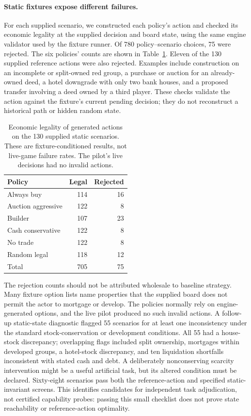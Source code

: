 \paragraph{Static fixtures expose different failures.}
For each supplied scenario, we constructed each policy's action and checked its economic legality at the supplied decision and board state, using the same engine validator used by the fixture runner. Of 780 policy--scenario choices, 75 were rejected. The six policies' counts are shown in Table~\ref{tab:agenda-fixture-legality}. Eleven of the 130 supplied reference actions were also rejected. Examples include construction on an incomplete or split-owned red group, a purchase or auction for an already-owned deed, a hotel downgrade with only two bank houses, and a proposed transfer involving a deed owned by a third player. These checks validate the action against the fixture's current pending decision; they do not reconstruct a historical path or hidden random state.

\begin{table}[htbp]
\centering
\caption{Economic legality of generated actions on the 130 supplied static scenarios. These are fixture-conditioned results, not live-game failure rates. The pilot's live decisions had no invalid actions.}
\label{tab:agenda-fixture-legality}
\begin{tabular}{lrr}
\toprule
Policy & Legal & Rejected \\
\midrule
Always buy & 114 & 16 \\
Auction aggressive & 122 & 8 \\
Builder & 107 & 23 \\
Cash conservative & 122 & 8 \\
No trade & 122 & 8 \\
Random legal & 118 & 12 \\
\midrule
Total & 705 & 75 \\
\bottomrule
\end{tabular}
\end{table}

The rejection counts should not be attributed wholesale to baseline strategy. Many fixture option lists name properties that the supplied board does not permit the actor to mortgage or develop. The policies normally rely on engine-generated options, and the live pilot produced no such invalid actions. A follow-up static-state diagnostic flagged 55 scenarios for at least one inconsistency under the standard stock-conservation or development conditions. All 55 had a house-stock discrepancy; overlapping flags included split ownership, mortgages within developed groups, a hotel-stock discrepancy, and ten liquidation shortfalls inconsistent with stated cash and debt. A deliberately nonconserving scarcity intervention might be a useful artificial task, but its altered condition must be declared. Sixty-eight scenarios pass both the reference-action and specified static-invariant screens. This identifies candidates for independent task adjudication, not certified capability probes: passing this small checklist does not prove state reachability or reference-action optimality.

